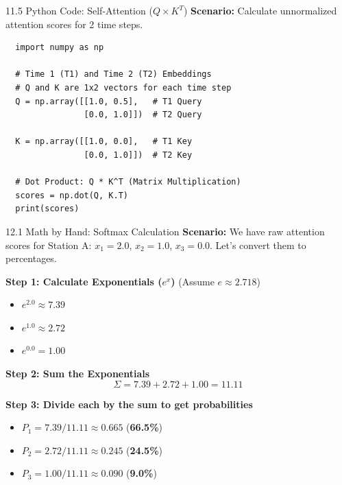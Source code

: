 \documentclass[aspectratio=169]{beamer}
\begin{document}
\begin{frame}[fragile]{11.5 Python Code: Self-Attention ($Q \times K^T$)}
  \textbf{Scenario:} Calculate unnormalized attention scores for 2 time steps.
  \begin{verbatim}
  import numpy as np

  # Time 1 (T1) and Time 2 (T2) Embeddings
  # Q and K are 1x2 vectors for each time step
  Q = np.array([[1.0, 0.5],   # T1 Query
                [0.0, 1.0]])  # T2 Query
                
  K = np.array([[1.0, 0.0],   # T1 Key
                [0.0, 1.0]])  # T2 Key

  # Dot Product: Q * K^T (Matrix Multiplication)
  scores = np.dot(Q, K.T)
  print(scores)
  \end{verbatim}
\end{frame}


\begin{frame}{12.1 Math by Hand: Softmax Calculation}
  \textbf{Scenario:} We have raw attention scores for Station A: $x_1 = 2.0$, $x_2 = 1.0$, $x_3 = 0.0$. Let's convert them to percentages.
  
  \vspace{0.2cm}
  \textbf{Step 1: Calculate Exponentials ($e^x$)} (Assume $e \approx 2.718$)
  \begin{itemize}
      \item $e^{2.0} \approx 7.39$
      \item $e^{1.0} \approx 2.72$
      \item $e^{0.0} = 1.00$
  \end{itemize}
  
  \textbf{Step 2: Sum the Exponentials}
  $$ \Sigma = 7.39 + 2.72 + 1.00 = 11.11 $$
  
  \textbf{Step 3: Divide each by the sum to get probabilities}
  \begin{itemize}
      \item $P_1 = 7.39 / 11.11 \approx 0.665$ (\textbf{66.5\%})
      \item $P_2 = 2.72 / 11.11 \approx 0.245$ (\textbf{24.5\%})
      \item $P_3 = 1.00 / 11.11 \approx 0.090$ (\textbf{9.0\%})
  \end{itemize}
\end{frame}
\end{document}
